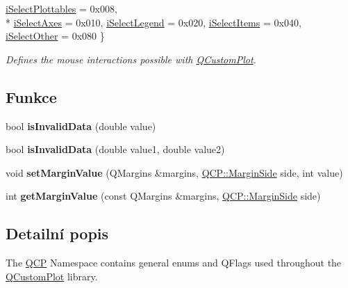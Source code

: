 \begin{DoxyCompactItemize}
\hyperlink{namespaceQCP_a2ad6bb6281c7c2d593d4277b44c2b037a67148c8227b4155eca49135fc274c7ec}{i\+Select\+Plottables} = 0x008, 
\\*
\hyperlink{namespaceQCP_a2ad6bb6281c7c2d593d4277b44c2b037ad6644ac55bef621645326e9dd7469caa}{i\+Select\+Axes} = 0x010, 
\hyperlink{namespaceQCP_a2ad6bb6281c7c2d593d4277b44c2b037a269c9af298e257d1108edec0432b5513}{i\+Select\+Legend} = 0x020, 
\hyperlink{namespaceQCP_a2ad6bb6281c7c2d593d4277b44c2b037aea2f7c105d674e76d9b187b02ef29260}{i\+Select\+Items} = 0x040, 
\hyperlink{namespaceQCP_a2ad6bb6281c7c2d593d4277b44c2b037af67a50bc26147a13b551b3a625374949}{i\+Select\+Other} = 0x080
 \}\begin{DoxyCompactList}\small\item\em Defines the mouse interactions possible with \hyperlink{classQCustomPlot}{Q\+Custom\+Plot}. \end{DoxyCompactList}
\end{DoxyCompactItemize}
\subsection*{Funkce}
\begin{DoxyCompactItemize}
\item 
\hypertarget{namespaceQCP_a07ab701c05329089f933b9cae2638a63}{}bool {\bfseries is\+Invalid\+Data} (double value)\label{namespaceQCP_a07ab701c05329089f933b9cae2638a63}

\item 
\hypertarget{namespaceQCP_a728903e5c3dd17847bee280f4005496f}{}bool {\bfseries is\+Invalid\+Data} (double value1, double value2)\label{namespaceQCP_a728903e5c3dd17847bee280f4005496f}

\item 
\hypertarget{namespaceQCP_afbf6e3084c108f2bb4372107945ee82f}{}void {\bfseries set\+Margin\+Value} (Q\+Margins \&margins, \hyperlink{namespaceQCP_a7e487e3e2ccb62ab7771065bab7cae54}{Q\+C\+P\+::\+Margin\+Side} side, int value)\label{namespaceQCP_afbf6e3084c108f2bb4372107945ee82f}

\item 
\hypertarget{namespaceQCP_a23a2679d3495c444acc26acc61e35b5b}{}int {\bfseries get\+Margin\+Value} (const Q\+Margins \&margins, \hyperlink{namespaceQCP_a7e487e3e2ccb62ab7771065bab7cae54}{Q\+C\+P\+::\+Margin\+Side} side)\label{namespaceQCP_a23a2679d3495c444acc26acc61e35b5b}

\end{DoxyCompactItemize}


\subsection{Detailní popis}
The \hyperlink{namespaceQCP}{Q\+C\+P} Namespace contains general enums and Q\+Flags used throughout the \hyperlink{classQCustomPlot}{Q\+Custom\+Plot} library. 

